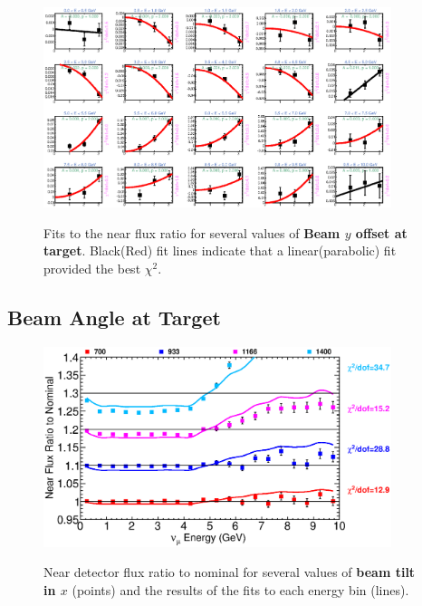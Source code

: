 \begin{figure}[hb]
  \begin{center}
    {\includegraphics[width=4.0in]{figures/NominalY_near_fits.eps}}
  \end{center}
\caption{ Fits to the near flux ratio for several values of {\bf Beam $y$ offset at target}. Black(Red) fit lines indicate that a linear(parabolic) fit provided the best $\chi^2$. }
\end{figure}

\clearpage
\subsection{Beam Angle at Target}

\begin{figure}[ht]
  \begin{center}
    {\includegraphics[width=4.0in]{figures/Tilt_t_near_summary.eps}}
  \end{center}
\caption{ Near detector flux ratio to nominal for several values of {\bf beam tilt in $x$} (points) and the results of the fits to each energy bin (lines).}
\end{figure}

